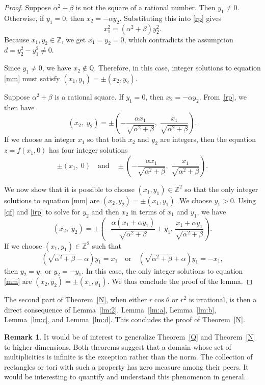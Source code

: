 \documentclass[11pt]{amsart}
\theoremstyle{definition}
\newtheorem*{remark}{Remark}
\begin{document}
\begin{proof}
Suppose $\alpha^2 + \beta$ is not the square of a rational number. Then $y_1\not=0$. Otherwise, if $y_1=0$, then $x_2 = -\alpha y_2$. Substituting this into \eqref{rp} gives
\begin{equation}
  x^2_1 = (\alpha^2+\beta) y^2_2.
\end{equation}
Because $x_1, y_2 \in \mathbb{Z}$, we get $x_1 = y_2 = 0$, which contradicts the assumption $d = y_2^2- y_1^2 \neq 0$.\par

Since $y_1 \neq 0$, we have $x_2\not\in\mathbb{Q}$. Therefore, in this case, integer solutions to equation \eqref{mm} must satisfy $(x_1, y_1)=\pm (x_2, y_2).$ 

Suppose $\alpha^2 + \beta$ is a rational square. If $y_1=0$, then $x_2=-\alpha y_2$. From~\eqref{rp}, 
we then have
\[
(x_2, \; y_2)=\pm(-\frac{\alpha x_1}{\sqrt{\alpha^2+\beta}}, \;  \frac{x_1}{\sqrt{\alpha^2+\beta}}).
\]
If we choose an integer $x_1$ so that both $x_2$ and $y_2$ are integers, then the equation $z=f(x_1, 0)$ has four integer solutions 
\[
\pm (x_1,\; 0) \quad \text{and} \quad \pm (-\frac{\alpha x_1}{\sqrt{\alpha^2+\beta}}, \; \frac{x_1}{\sqrt{\alpha^2+\beta}}).
\]

We now show that it is possible to choose $(x_1, y_1)\in\mathbb{Z}^2$ so that the only integer solutions to equation \eqref{mm} are $(x_2, y_2)=\pm (x_1, y_1)$. We choose $y_1>0$.  Using \eqref{qf} and \eqref{irp} to solve for $y_2$ and then $x_2$ in terms of $x_1$ and $y_1$, we have 
\begin{equation}\label{xy2}
(x_2, \; y_2)=\pm (-\frac{\alpha(x_1+\alpha y_1)}{\sqrt{\alpha^2+\beta}}+y_1, \, \frac{x_1+\alpha y_1}{\sqrt{\alpha^2+\beta}}).
\end{equation}
If we choose $(x_1, y_1)\in\mathbb{Z}^2$ such that 
\[
(\sqrt{\alpha^2+\beta}-\alpha) y_1=x_1\quad \text{or}\quad (\sqrt{\alpha^2+\beta}+\alpha)y_1=-x_1,
\]
then $y_2=y_1$ or $y_2=-y_1$. In this case, the only integer solutions to equation \eqref{mm} are $(x_2, y_2)=\pm (x_1, y_1)$.  We thus conclude the proof of the lemma.
\end{proof}

The second part of Theorem~\ref{N}, when either $r\cos\theta$ or $r^2$ is irrational, is then a direct consequence of Lemma~\ref{lm:2}, Lemma~\ref{lm:a},
Lemma~\ref{lm:b}, Lemma~\ref{lm:c}, and Lemma~\ref{lm:d}. This concludes the proof of Theorem~\ref{N}.


\begin{remark} It would be of interest to generalize Theorem~\ref{Q} and Theorem~\ref{N} to higher dimensions. Both theorems suggest that a domain whose set 
	of multiplicities is infinite is the exception rather than the norm. The collection of rectangles or tori with such a property has zero measure among their peers.  It would be interesting to quantify and understand this phenomenon in general. 
\end{remark}
\end{document}

